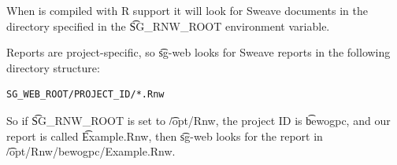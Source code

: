   When  is compiled with R support it will look for
  Sweave documents in the directory specified in the \t{SG\_RNW\_ROOT}
  environment variable.

  Reports are project-specific, so \t{sg-web} looks for Sweave reports
  in the following directory structure:

\begin{siderules}
\begin{verbatim}
SG_WEB_ROOT/PROJECT_ID/*.Rnw
\end{verbatim}
\end{siderules}

  So if \t{SG\_RNW\_ROOT} is set to \t{/opt/Rnw}, the project ID is
  \t{bewogpc}, and our report is called \t{Example.Rnw}, then \t{sg-web}
  looks for the report in \t{/opt/Rnw/bewogpc/Example.Rnw}.
